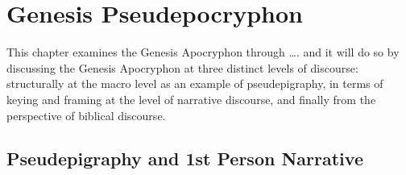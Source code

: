\hypertarget{genesis-pseudepocryphon}{%
\chapter{Genesis Pseudepocryphon}\label{genesis-pseudepocryphon}}

This chapter examines the Genesis Apocryphon through \ldots{}. and it
will do so by discussing the Genesis Apocryphon at three distinct levels
of discourse: structurally at the macro level as an example of
pseudepigraphy, in terms of keying and framing at the level of narrative
discourse, and finally from the perspective of biblical discourse.

\hypertarget{pseudepigraphy-and-1st-person-narrative}{%
\section{Pseudepigraphy and 1st Person
Narrative}\label{pseudepigraphy-and-1st-person-narrative}}

